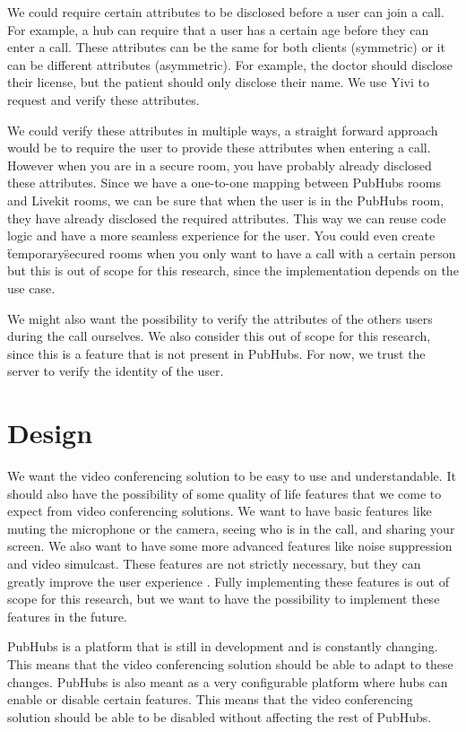 \documentclass{report}
\begin{document}
We could require certain attributes to be disclosed before a user can join a call. For example, a hub
can require that a user has a certain age before they can enter a call. These attributes can be the same for both
clients (symmetric) or it can be different attributes (asymmetric). For example, the doctor should disclose their license,
but the patient should only disclose their name. We use Yivi to request and verify these attributes.

We could verify these attributes in multiple ways, a straight forward approach would be to require the user to provide
these attributes when entering a call. However when you are in a secure room, you have probably already disclosed these
attributes. Since we have a one-to-one mapping between PubHubs rooms and Livekit rooms, we can be sure that when the
user is in the PubHubs room, they have already disclosed the required attributes. This way we can reuse code logic and
have a more seamless experience for the user. You could even create \"temporary\" secured rooms when you only want
to have a call with a certain person but this is out of scope for this research, since the implementation depends
on the use case.

We might also want the possibility to verify the attributes of the others users during the call ourselves. We also
consider this out of scope for this research, since this is a feature that is not present in PubHubs. For now, we trust
the server to verify the identity of the user.

\section{Design}
We want the video conferencing solution to be easy to use and understandable. It should also have the possibility of
some quality of life features that we come to expect from video conferencing solutions. We want to have basic
features like muting the microphone or the camera, seeing who is in the call, and sharing your screen. We also want
to have some more advanced features like noise suppression and video simulcast. These features are not strictly
necessary, but they can greatly improve the user experience \cite{skowronek_quality_2022}.
Fully implementing these features is out of scope for this research, but we want to have the possibility to implement
these features in the future.

PubHubs is a platform that is still in development and is constantly changing. This means that the video
conferencing solution should be able to adapt to these changes. PubHubs is also meant as a very configurable platform
where hubs can enable or disable certain features. This means that the video conferencing solution should be able to
be disabled without affecting the rest of PubHubs.
\end{document}
